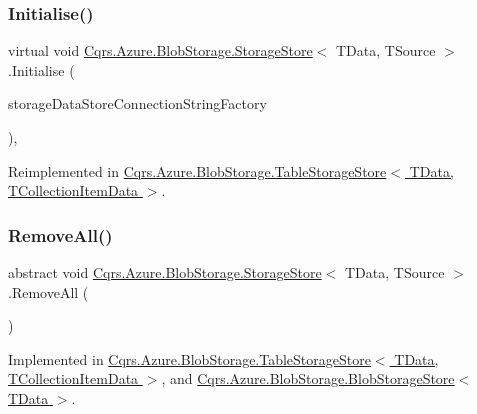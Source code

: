 \subsubsection{\texorpdfstring{Initialise()}{Initialise()}}
{\footnotesize\ttfamily virtual void \hyperlink{classCqrs_1_1Azure_1_1BlobStorage_1_1StorageStore}{Cqrs.\+Azure.\+Blob\+Storage.\+Storage\+Store}$<$ T\+Data, T\+Source $>$.Initialise (\begin{DoxyParamCaption}\item[{\hyperlink{interfaceCqrs_1_1Azure_1_1BlobStorage_1_1IStorageStoreConnectionStringFactory}{I\+Storage\+Store\+Connection\+String\+Factory}}]{storage\+Data\+Store\+Connection\+String\+Factory }\end{DoxyParamCaption})\hspace{0.3cm}{\ttfamily [protected]}, {\ttfamily [virtual]}}



Reimplemented in \hyperlink{classCqrs_1_1Azure_1_1BlobStorage_1_1TableStorageStore_ae775f039a168cc48c731314c7e494bb6_ae775f039a168cc48c731314c7e494bb6}{Cqrs.\+Azure.\+Blob\+Storage.\+Table\+Storage\+Store$<$ T\+Data, T\+Collection\+Item\+Data $>$}.

\mbox{\label{classCqrs_1_1Azure_1_1BlobStorage_1_1StorageStore_a4e848f342be903293812b3b660464d1a_a4e848f342be903293812b3b660464d1a}} 
\subsubsection{\texorpdfstring{Remove\+All()}{RemoveAll()}}
{\footnotesize\ttfamily abstract void \hyperlink{classCqrs_1_1Azure_1_1BlobStorage_1_1StorageStore}{Cqrs.\+Azure.\+Blob\+Storage.\+Storage\+Store}$<$ T\+Data, T\+Source $>$.Remove\+All (\begin{DoxyParamCaption}{ }\end{DoxyParamCaption})\hspace{0.3cm}{\ttfamily [pure virtual]}}



Implemented in \hyperlink{classCqrs_1_1Azure_1_1BlobStorage_1_1TableStorageStore_aadd66b35bfa105ef4446bd791e99a3d5_aadd66b35bfa105ef4446bd791e99a3d5}{Cqrs.\+Azure.\+Blob\+Storage.\+Table\+Storage\+Store$<$ T\+Data, T\+Collection\+Item\+Data $>$}, and \hyperlink{classCqrs_1_1Azure_1_1BlobStorage_1_1BlobStorageStore_a4371b95250e51b8462d8ab33b6f3fe9e_a4371b95250e51b8462d8ab33b6f3fe9e}{Cqrs.\+Azure.\+Blob\+Storage.\+Blob\+Storage\+Store$<$ T\+Data $>$}.

